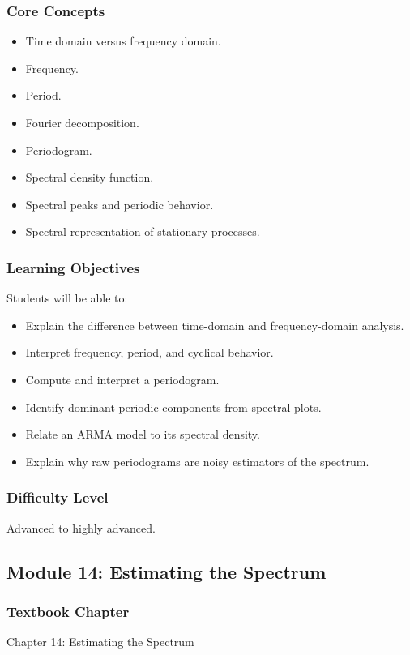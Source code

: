 \documentclass[11pt]{article}
\begin{document}
\subsubsection*{Core Concepts}
\begin{itemize}
    \item Time domain versus frequency domain.
    \item Frequency.
    \item Period.
    \item Fourier decomposition.
    \item Periodogram.
    \item Spectral density function.
    \item Spectral peaks and periodic behavior.
    \item Spectral representation of stationary processes.
\end{itemize}

\subsubsection*{Learning Objectives}
Students will be able to:
\begin{itemize}
    \item Explain the difference between time-domain and frequency-domain analysis.
    \item Interpret frequency, period, and cyclical behavior.
    \item Compute and interpret a periodogram.
    \item Identify dominant periodic components from spectral plots.
    \item Relate an ARMA model to its spectral density.
    \item Explain why raw periodograms are noisy estimators of the spectrum.
\end{itemize}

\subsubsection*{Difficulty Level}
Advanced to highly advanced.

\subsection{Module 14: Estimating the Spectrum}

\subsubsection*{Textbook Chapter}
Chapter 14: Estimating the Spectrum
\end{document}
